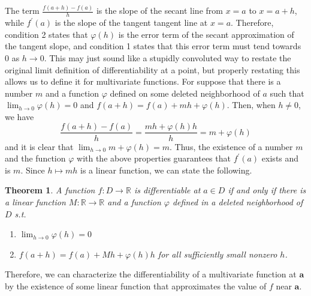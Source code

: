 \documentclass{article}
\newtheorem{theorem}{Theorem}[section]
\theoremstyle{remark}
\theoremstyle{definition}
\begin{document}
The term $\frac{f(a + h) - f(a)}{h}$ is the slope of the secant line from $x = a$ to $x = a + h$, while $f^\prime(a)$ is the slope of the tangent tangent line at $x = a$. Therefore, condition 2 states that $\varphi(h)$ is the error term of the secant approximation of the tangent slope, and condition 1 states that this error term must tend towards $0$ as $h \rightarrow 0$. This may just sound like a stupidly convoluted way to restate the original limit definition of differentiability at a point, but properly restating this allows us to define it for multivariate functions. For suppose that there is a number $m$ and a function $\varphi$ defined on some deleted neighborhood of $a$ such that $\lim_{h \rightarrow 0} \varphi(h) = 0$ and $f(a + h) = f(a) + m h + \varphi(h)$. Then, when $h \neq 0$, we have 
\[\frac{f(a + h) - f(a)}{h} = \frac{m h + \varphi(h) h}{h} = m + \varphi(h
)\]
and it is clear that $\lim_{h \rightarrow 0} m + \varphi(h) = m$. Thus, the existence of a number $m$ and the function $\varphi$ with the above properties guarantees that $f^\prime(a)$ exists and is $m$. Since $h \mapsto m h$ is a linear function, we can state the following. 

\begin{theorem}
A function $f: D \longrightarrow \mathbb{R}$ is differentiable at $a \in D$ if and only if there is a linear function $M: \mathbb{R} \longrightarrow \mathbb{R}$ and a function $\varphi$ defined in a deleted neighborhood of $D$ s.t. 
\begin{enumerate}
    \item $\lim_{h \rightarrow 0} \varphi(h) = 0$
    \item $f(a + h) = f(a) + M h + \varphi(h) h$ for all sufficiently small nonzero $h$. 
\end{enumerate}
\end{theorem}

Therefore, we can characterize the differentiability of a multivariate function at $\mathbf{a}$ by the existence of some linear function that approximates the value of $f$ near $\mathbf{a}$. 
\end{document}
